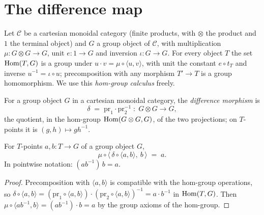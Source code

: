 \section{The difference map}
\label{pa-sec:difference_map}

Let \(\mathcal C\) be a cartesian monoidal category (finite products, with
\(\otimes\) the product and \(1\) the terminal object) and \(G\) a group object
of \(\mathcal C\), with multiplication \(\mu : G \otimes G \to G\), unit
\(e : 1 \to G\) and inversion \(\iota : G \to G\). For every object \(T\) the
set \(\operatorname{Hom}(T, G)\) is a group under \(u \cdot v = \mu \circ \langle u,
v\rangle\), with unit the constant \(e \circ t_T\) and inverse
\(u^{-1} = \iota \circ u\); precomposition with any morphism \(T' \to T\) is a
group homomorphism. We use this \emph{hom-group calculus} freely.

\begin{definition}
  \label{pa-def:grp_diff}
  \leanok

  For a group object \(G\) in a cartesian monoidal category, the
  \emph{difference morphism} is
  \[
    \delta \;=\; \mathrm{pr}_1 \cdot \mathrm{pr}_2^{-1}
    \;:\; G \otimes G \longrightarrow G,
  \]
  the quotient, in the hom-group \(\operatorname{Hom}(G \otimes G, G)\), of the two
  projections; on \(T\)-points it is \((g, h) \mapsto g h^{-1}\).
\end{definition}

\begin{lemma}
  \label{pa-lem:grp_diff_reconstruct}
  \leanok

  For \(T\)-points \(a, b : T \to G\) of a group object \(G\),
  \[
    \mu \circ \bigl\langle\, \delta \circ \langle a, b\rangle,\ b \,\bigr\rangle
    \;=\; a .
  \]
  In pointwise notation: \((a b^{-1})\, b = a\).
\end{lemma}
\begin{proof}
  \leanok
  Precomposition with \(\langle a, b\rangle\) is compatible with the hom-group
  operations, so
  \(\delta \circ \langle a, b\rangle
  = (\mathrm{pr}_1 \circ \langle a,b\rangle)\cdot(\mathrm{pr}_2 \circ
  \langle a,b\rangle)^{-1} = a \cdot b^{-1}\) in \(\operatorname{Hom}(T, G)\). Then
  \(\mu \circ \langle a b^{-1}, b\rangle = (a b^{-1}) \cdot b = a\) by the group
  axioms of the hom-group.
\end{proof}

